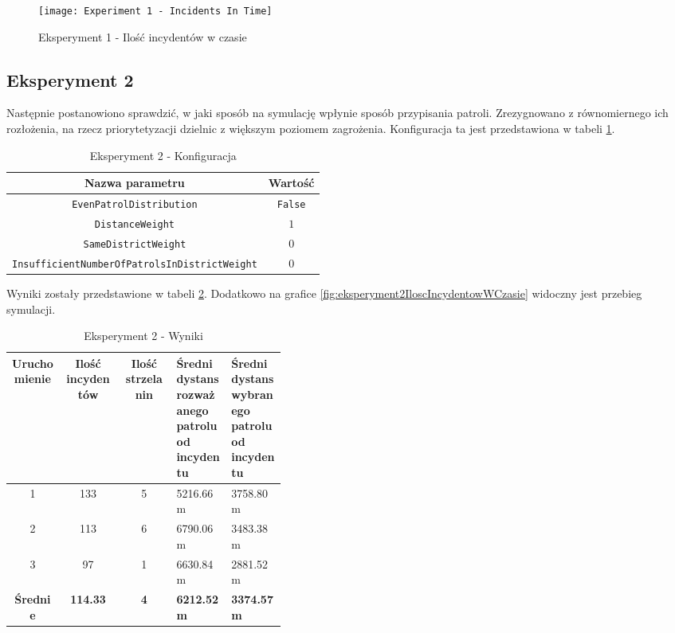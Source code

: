 \begin{figure}[H]
    \centering
    \texttt{[image: Experiment 1 - Incidents In Time]}
    \caption{Eksperyment 1 - Ilość incydentów w czasie}
    \label{fig:eksperyment1IloscIncydentowWCzasie}
\end{figure}

\subsection{Eksperyment 2}

\par Następnie postanowiono sprawdzić, w jaki sposób na symulację wpłynie sposób przypisania patroli. Zrezygnowano z równomiernego ich rozłożenia, na rzecz priorytetyzacji dzielnic z większym poziomem zagrożenia. Konfiguracja ta jest przedstawiona w tabeli \ref{tab:eksperyment2Konfiguracja}.

\begin{table}[H]
    \centering
    \begin{tabular}{|c|c|}
        \hline
        Nazwa parametru & Wartość \\
        \hline
        \hline
         \texttt{EvenPatrolDistribution} & \texttt{False} \\
         \hline
         \texttt{DistanceWeight} & $1$ \\
         \hline
         \texttt{SameDistrictWeight} & $0$ \\
         \hline
         \texttt{InsufficientNumberOfPatrolsInDistrictWeight} & $0$ \\
         \hline
    \end{tabular}
    \caption{Eksperyment 2 - Konfiguracja}
    \label{tab:eksperyment2Konfiguracja}
\end{table}

Wyniki zostały przedstawione w tabeli \ref{tab:eksperyment2Wyniki}. Dodatkowo na grafice \ref{fig:eksperyment2IloscIncydentowWCzasie} widoczny jest przebieg symulacji.

\begin{table}[H]
    \centering
    \begin{tabular}{|c|c|c|p{0.2\linewidth}|p{0.2\linewidth}|}
        \hline
        Uruchomienie & Ilość incydentów & Ilość strzelanin & Średni dystans rozważanego patrolu od incydentu & Średni dystans wybranego patrolu od incydentu \\
        \hline
        \hline
        1 & 133 & 5 & 5216.66m & 3758.80m \\
        \hline
        2 & 113 & 6 & 6790.06m & 3483.38m \\
        \hline
        3 & 97 & 1 & 6630.84m & 2881.52m \\
        \hline
        \hline
        \textbf{Średnie} & \textbf{114.33} & \textbf{4} & \textbf{6212.52m} & \textbf{3374.57m} \\
        \hline
    \end{tabular}
    \caption{Eksperyment 2 - Wyniki}
    \label{tab:eksperyment2Wyniki}
\end{table}

